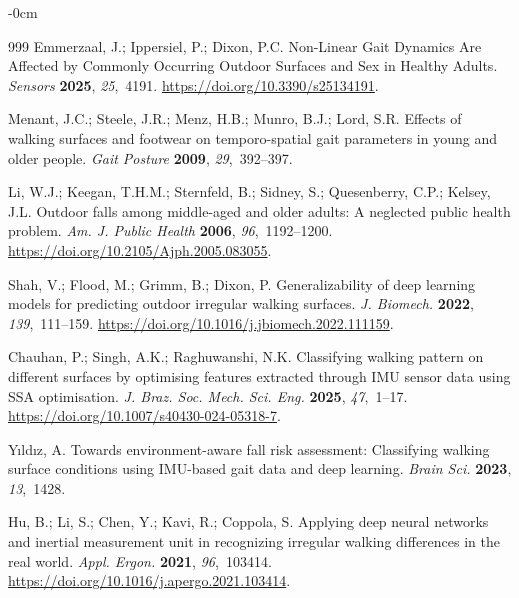 \documentclass[sensors,article,accept,pdftex,moreauthors]{Definitions/mdpi}
\begin{document}
\begin{adjustwidth}{-\extralength}{0cm}
\begin{thebibliography}{999}
Emmerzaal, J.; Ippersiel, P.; Dixon, P.C.
 Non-{Linear} {Gait} {Dynamics} {Are} {Affected} by {Commonly}
  {Occurring} {Outdoor} {Surfaces} and {Sex} in {Healthy} {Adults}.
 {\em Sensors} {\bf 2025}, {\em 25},~4191.
 {\url{https://doi.org/10.3390/s25134191}}.

Menant, J.C.; Steele, J.R.; Menz, H.B.; Munro, B.J.; Lord, S.R.
 Effects of walking surfaces and footwear on temporo-spatial gait
  parameters in young and older people.
 {\em Gait Posture} {\bf 2009}, {\em 29},~392--397.

Li, W.J.; Keegan, T.H.M.; Sternfeld, B.; Sidney, S.; Quesenberry, C.P.; Kelsey,
  J.L.
 Outdoor falls among middle-aged and older adults: {A} neglected
  public health problem.
 {\em Am. J. Public Health} {\bf 2006}, {\em 96},~1192--1200.
 {\url{https://doi.org/10.2105/Ajph.2005.083055}}.

Shah, V.; Flood, M.; Grimm, B.; Dixon, P.
 Generalizability of deep learning models for predicting outdoor
  irregular walking surfaces.
 {\em J. Biomech.} {\bf 2022}, {\em 139},~111--159.
  {\url{https://doi.org/10.1016/j.jbiomech.2022.111159}}.

Chauhan, P.; Singh, A.K.; Raghuwanshi, N.K.
 Classifying walking pattern on different surfaces by optimising
  features extracted through IMU sensor data using SSA optimisation.
 {\em J. Braz. Soc. Mech. Sci.  
  Eng.} {\bf 2025}, {\em 47},~1--17.
 {\url{https://doi.org/10.1007/s40430-024-05318-7}}.

Y{\i}ld{\i}z, A.
 Towards environment-aware fall risk assessment: Classifying walking
  surface conditions using IMU-based gait data and deep learning.
 {\em Brain Sci.} {\bf 2023}, {\em 13},~1428.

Hu, B.; Li, S.; Chen, Y.; Kavi, R.; Coppola, S.
 Applying deep neural networks and inertial measurement unit in
  recognizing irregular walking differences in the real world.
 {\em Appl. Ergon.} {\bf 2021}, {\em 96},~103414.
 {\url{https://doi.org/10.1016/j.apergo.2021.103414}}.


\end{thebibliography}
\end{adjustwidth}
\end{document}
